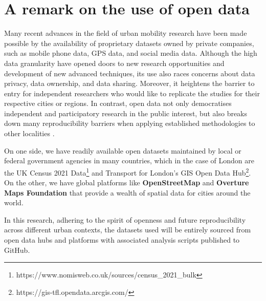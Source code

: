 \section{A remark on the use of open data}

Many recent advances in the field of urban mobility research have been made possible by the availability of proprietary datasets owned by private companies, such as mobile phone data, GPS data, and social media data. Although the high data granularity have opened doors to new research opportunities and development of new advanced techniques, its use also races concerns about data privacy, data ownership, and data sharing. Moreover, it heightens the barrier to entry for independent researchers who would like to replicate the studies for their respective cities or regions. In contrast, open data not only democratises independent and participatory research in the public interest, but also breaks down many reproducibility barriers when applying established methodologies to other localities \citep{yadavRoleOpenData2017}.

On one side, we have readily available open datasets maintained by local or federal government agencies in many countries, which in the case of London are the UK Census 2021 Data\footnote{https://www.nomisweb.co.uk/sources/census\_2021\_bulk} and Transport for London's GIS Open Data Hub\footnote{https://gis-tfl.opendata.arcgis.com/}. On the other, we have global platforms like \textbf{OpenStreetMap} and \textbf{Overture Maps Foundation} that provide a wealth of spatial data for cities around the world.

In this research, adhering to the spirit of openness and future reproducibility across different urban contexts, the datasets used will be entirely sourced from open data hubs and platforms with associated analysis scripts published to GitHub.
 